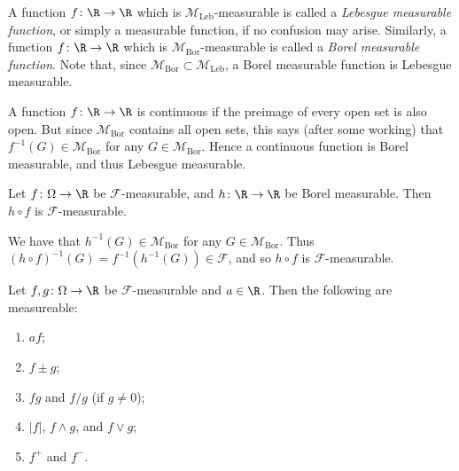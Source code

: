 \documentclass{maths}
\newcommand{\mleb}{\mathcal{M}_{\text{Leb}}}
\newcommand{\mbor}{\mathcal{M}_{\text{Bor}}}
\newcommand{\alg}{\mathcal{F}}
\begin{document}
\begin{defn}
    A function $f\colon\R\to\R$ which is $\mleb$-measurable is called a \emph{Lebesgue measurable function}, or simply a measurable function, if no confusion may arise.
    Similarly, a function $f\colon\R\to\R$ which is $\mbor$-measurable is called a \emph{Borel measurable function}.
    Note that, since $\mbor\subset\mleb$, a Borel measurable function is Lebesgue measurable.
\end{defn}

\begin{rem}
    A function $f\colon\R\to\R$ is continuous if the preimage of every open set is also open.
    But since $\mbor$ contains all open sets, this says (after some working) that $f^{-1}(G)\in\mbor$ for any $G\in\mbor$.
    Hence a continuous function is Borel measurable, and thus Lebesgue measurable.
\end{rem}

\begin{prop}
    Let $f\colon\Omega\to\R$ be $\alg$-measurable, and $h\colon\R\to\R$ be Borel measurable.
    Then $h\circ f$ is $\alg$-measurable.
\end{prop}

\begin{prf}
    We have that $h^{-1}(G)\in\mbor$ for any $G\in\mbor$.
    Thus $(h\circ f)^{-1}(G)=f^{-1}(h^{-1}(G))\in\alg$, and so $h\circ f$ is $\alg$-measurable.
\end{prf}

\begin{prop}
    Let $f,g\colon\Omega\to\R$ be $\alg$-measurable and $a\in\R$.
    Then the following are measureable:
    \begin{enumerate}
        \item $af$;
        \item $f\pm g$;
        \item $fg$ and $f/g$ (if $g\neq0$);
        \item $|f|$, $f\wedge g$, and $f\vee g$;
        \item $f^+$ and $f^-$.
    \end{enumerate}
\end{prop}
\end{document}
